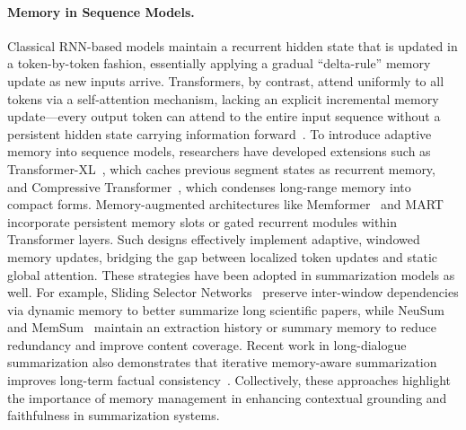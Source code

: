\documentclass{article}
\begin{document}
\paragraph{Memory in Sequence Models.}
Classical RNN-based models maintain a recurrent hidden state that is updated in a token-by-token fashion, essentially applying a gradual “delta-rule” memory update as new inputs arrive. Transformers, by contrast, attend uniformly to all tokens via a self-attention mechanism, lacking an explicit incremental memory update—every output token can attend to the entire input sequence without a persistent hidden state carrying information forward~\citep{dai2019transformerxl}. To introduce adaptive memory into sequence models, researchers have developed extensions such as Transformer-XL~\citep{dai2019transformerxl}, which caches previous segment states as recurrent memory, and Compressive Transformer~\citep{rae2019compressive}, which condenses long-range memory into compact forms. Memory-augmented architectures like Memformer~\citep{wu2022memformer} and MART~\citep{lei2020mart} incorporate persistent memory slots or gated recurrent modules within Transformer layers. Such designs effectively implement adaptive, windowed memory updates, bridging the gap between localized token updates and static global attention. These strategies have been adopted in summarization models as well. For example, Sliding Selector Networks~\citep{cui2021sliding} preserve inter-window dependencies via dynamic memory to better summarize long scientific papers, while NeuSum~\citep{zhou2018neusum} and MemSum~\citep{gu2022memsum} maintain an extraction history or summary memory to reduce redundancy and improve content coverage. Recent work in long-dialogue summarization also demonstrates that iterative memory-aware summarization improves long-term factual consistency~\citep{wang2024recursive}. Collectively, these approaches highlight the importance of memory management in enhancing contextual grounding and faithfulness in summarization systems.
\end{document}
